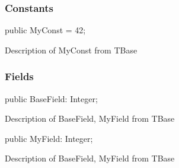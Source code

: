 \documentclass{report}
\newif\ifpdf
\begin{document}
\subsubsection*{\large{\textbf{Constants}}\normalsize\hspace{1ex}\hfill}
\begin{list}{}{
\setlength{\itemindent}{0cm}
\setlength{\listparindent}{0cm}
\setlength{\leftmargin}{\evensidemargin}
\addtolength{\leftmargin}{\tmplength}
\settowidth{\labelsep}{X}
\addtolength{\leftmargin}{\labelsep}
\setlength{\labelwidth}{\tmplength}
}
\label{ok_inherited_members_hide_ancestor.TBase-MyConst}
\item[\textbf{MyConst}\hfill]
\ifpdf
\begin{flushleft}
\fi
\begin{ttfamily}
public MyConst = 42;\end{ttfamily}

\ifpdf
\end{flushleft}
\fi


\par Description of MyConst from TBase\end{list}
\subsubsection*{\large{\textbf{Fields}}\normalsize\hspace{1ex}\hfill}
\begin{list}{}{
\setlength{\itemindent}{0cm}
\setlength{\listparindent}{0cm}
\setlength{\leftmargin}{\evensidemargin}
\addtolength{\leftmargin}{\tmplength}
\settowidth{\labelsep}{X}
\addtolength{\leftmargin}{\labelsep}
\setlength{\labelwidth}{\tmplength}
}
\label{ok_inherited_members_hide_ancestor.TBase-BaseField}
\item[\textbf{BaseField}\hfill]
\ifpdf
\begin{flushleft}
\fi
\begin{ttfamily}
public BaseField: Integer;\end{ttfamily}

\ifpdf
\end{flushleft}
\fi


\par Description of BaseField, MyField from TBase\label{ok_inherited_members_hide_ancestor.TBase-MyField}
\item[\textbf{MyField}\hfill]
\ifpdf
\begin{flushleft}
\fi
\begin{ttfamily}
public MyField: Integer;\end{ttfamily}

\ifpdf
\end{flushleft}
\fi


\par Description of BaseField, MyField from TBase\end{list}
\end{document}
